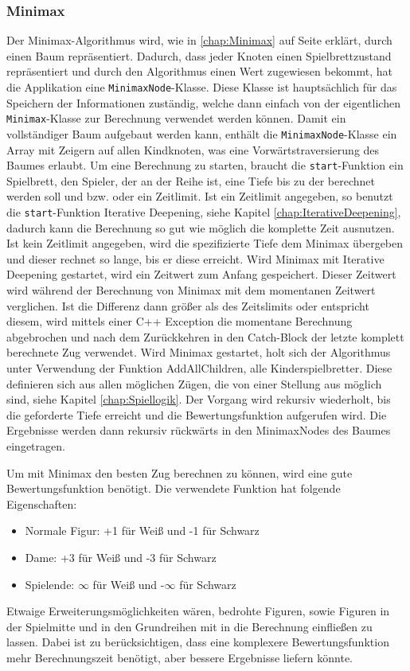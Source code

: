 \documentclass[12pt,a4paper,bibliography=totocnumbered,listof=totocnumbered]{article}
\begin{document}
\subsubsection{Minimax}
Der Minimax-Algorithmus wird, wie in \ref{chap:Minimax} auf Seite \pageref{chap:Minimax} erklärt, durch einen Baum repräsentiert. Dadurch, dass jeder Knoten einen Spielbrettzustand
repräsentiert und durch den Algorithmus einen Wert zugewiesen bekommt, hat die Applikation eine \texttt{MinimaxNode}-Klasse.
Diese Klasse ist hauptsächlich für das Speichern der Informationen zuständig, welche dann einfach von der eigentlichen \texttt{Minimax}-Klasse zur Berechnung
verwendet werden können. Damit ein vollständiger Baum aufgebaut werden kann, enthält die \texttt{MinimaxNode}-Klasse ein Array mit Zeigern auf allen 
Kindknoten, was eine Vorwärtstraversierung des Baumes erlaubt. 
Um eine Berechnung zu starten, braucht die \texttt{start}-Funktion ein Spielbrett, den Spieler, der an der Reihe ist, eine
Tiefe bis zu der berechnet werden soll und bzw. oder ein Zeitlimit. Ist ein Zeitlimit angegeben, so benutzt die \texttt{start}-Funktion Iterative Deepening, siehe Kapitel
\ref{chap:IterativeDeepening}, dadurch kann die Berechnung so gut wie möglich die komplette Zeit ausnutzen. Ist kein Zeitlimit angegeben, 
wird die spezifizierte Tiefe dem Minimax übergeben und dieser rechnet so lange, bis er diese erreicht. Wird Minimax mit Iterative Deepening gestartet,
wird ein Zeitwert zum Anfang gespeichert. Dieser Zeitwert wird während der Berechnung von Minimax mit dem momentanen Zeitwert verglichen. Ist die 
Differenz dann größer als des Zeitslimits oder entspricht diesem, wird mittels einer C++ Exception die momentane Berechnung abgebrochen und nach dem Zurückkehren in 
den Catch-Block der letzte komplett berechnete Zug verwendet. 
Wird Minimax gestartet, holt sich der Algorithmus unter Verwendung der Funktion AddAllChildren, alle Kinderspielbretter. Diese 
definieren sich aus allen möglichen Zügen, die von einer Stellung aus möglich sind, siehe Kapitel \ref{chap:Spiellogik}. Der Vorgang wird 
rekursiv wiederholt, bis die geforderte Tiefe erreicht und die Bewertungsfunktion aufgerufen wird. Die Ergebnisse werden dann rekursiv rückwärts in 
den MinimaxNodes des Baumes eingetragen.

Um mit Minimax den besten Zug berechnen zu können, wird eine gute Bewertungsfunktion 
benötigt. Die verwendete Funktion hat folgende Eigenschaften:
\begin{itemize}
    \item Normale Figur: +1 für Weiß und -1 für Schwarz
    \item Dame: +3 für Weiß und -3 für Schwarz
    \item Spielende: $\infty$ für Weiß und -$\infty$ für Schwarz
\end{itemize} 
Etwaige Erweiterungsmöglichkeiten wären, bedrohte Figuren, sowie Figuren in der Spielmitte und in den Grundreihen mit in die Berechnung einfließen zu lassen.
Dabei ist zu berücksichtigen, dass eine komplexere Bewertungsfunktion mehr Berechnungszeit benötigt, aber bessere Ergebnisse liefern könnte.
\end{document}
